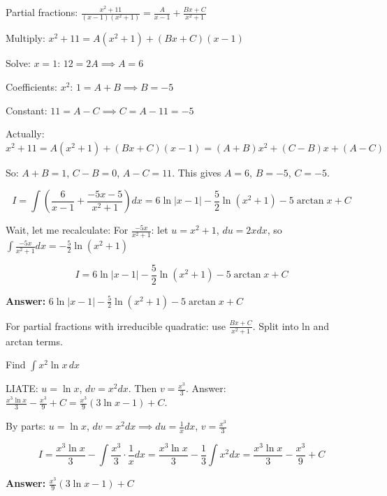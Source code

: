 \begin{solution}
Partial fractions: $\frac{x^2+11}{(x-1)(x^2+1)} = \frac{A}{x-1} + \frac{Bx+C}{x^2+1}$

Multiply: $x^2+11 = A(x^2+1) + (Bx+C)(x-1)$

Solve: $x=1$: $12 = 2A \implies A=6$

Coefficients: $x^2$: $1 = A+B \implies B=-5$

Constant: $11 = A-C \implies C=A-11=-5$

Actually: $x^2+11 = A(x^2+1) + (Bx+C)(x-1) = (A+B)x^2 + (C-B)x + (A-C)$

So: $A+B=1$, $C-B=0$, $A-C=11$. This gives $A=6$, $B=-5$, $C=-5$.

\[
I = \int\left(\frac{6}{x-1} + \frac{-5x-5}{x^2+1}\right)dx = 6\ln|x-1| - \frac{5}{2}\ln(x^2+1) - 5\arctan x + C
\]

Wait, let me recalculate: For $\frac{-5x}{x^2+1}$: let $u=x^2+1$, $du=2xdx$, so $\int\frac{-5x}{x^2+1}dx = -\frac{5}{2}\ln(x^2+1)$

\[
I = 6\ln|x-1| - \frac{5}{2}\ln(x^2+1) - 5\arctan x + C
\]

\textbf{Answer:} $\boxed{6\ln|x-1| - \frac{5}{2}\ln(x^2+1) - 5\arctan x + C}$
\end{solution}

\begin{takeaways}
For partial fractions with irreducible quadratic: use $\frac{Bx+C}{x^2+1}$. Split into ln and arctan terms.
\end{takeaways}

\vspace{1cm}

\begin{problem}
Find $\displaystyle \int x^2 \ln x \, dx$
\end{problem}

\begin{hint}
LIATE: $u = \ln x$, $dv = x^2 dx$. Then $v = \frac{x^3}{3}$. Answer: $\frac{x^3 \ln x}{3} - \frac{x^3}{9} + C = \frac{x^3}{9}(3\ln x - 1) + C$.
\end{hint}

\begin{solution}
By parts: $u=\ln x$, $dv=x^2dx \implies du=\frac{1}{x}dx$, $v=\frac{x^3}{3}$

\[
I = \frac{x^3\ln x}{3} - \int\frac{x^3}{3} \cdot \frac{1}{x}dx = \frac{x^3\ln x}{3} - \frac{1}{3}\int x^2dx = \frac{x^3\ln x}{3} - \frac{x^3}{9} + C
\]

\textbf{Answer:} $\boxed{\frac{x^3}{9}(3\ln x - 1) + C}$
\end{solution}


